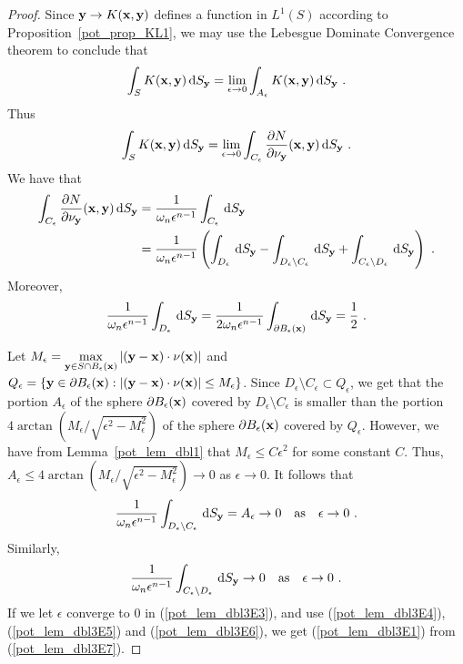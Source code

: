 \begin{proof}
Since $\mathbf{y} \to K(\mathbf{x},\mathbf{y})$ defines a function in
$\displaystyle L^1(S)$
according to Proposition~\ref{pot_prop_KL1}, we may use the Lebesgue
Dominate Convergence theorem to conclude that
\[
\int_S  K(\mathbf{x},\mathbf{y}) \,\mathrm{d}{S}_{\mathbf{y}}
= \lim_{\epsilon \to 0} \int_{A_\epsilon}  K(\mathbf{x},\mathbf{y}) \,\mathrm{d}{S}_{\mathbf{y}} \ .
\]
Thus
\begin{equation} \label{pot_lem_dbl3E7}
\int_S  K(\mathbf{x},\mathbf{y}) \,\mathrm{d}{S}_{\mathbf{y}}
= \lim_{\epsilon \to 0}
\int_{C_\epsilon} \frac{\partial{N}}{\partial \mathbf{\nu}_{\mathbf{y}}}(\mathbf{x},\mathbf{y}) \,\mathrm{d}{S}_{\mathbf{y}} \ .
\end{equation}
We have that
\begin{align}
\int_{C_\epsilon} \frac{\partial{N}}{\partial \mathbf{\nu}_{\mathbf{y}}}(\mathbf{x},\mathbf{y}) \,\mathrm{d}{S}_{\mathbf{y}}
&= \frac{1}{\omega_n \epsilon^{n-1}} \int_{C_\epsilon} \,\mathrm{d}{S}_{\mathbf{y}} \nonumber \\
&= \frac{1}{\omega_n \epsilon^{n-1}} \left( \int_{D_\epsilon} \,\mathrm{d}{S}_{\mathbf{y}}
- \int_{D_\epsilon \setminus C_\epsilon} \,\mathrm{d}{S}_{\mathbf{y}}
+ \int_{C_\epsilon \setminus D_\epsilon} \,\mathrm{d}{S}_{\mathbf{y}} \right) \ .
\label{pot_lem_dbl3E3} 
\end{align}
Moreover,
\begin{equation} \label{pot_lem_dbl3E4}
\frac{1}{\omega_n \epsilon^{n-1}} \int_{D_\epsilon} \dss{S}{y}
= \frac{1}{2 \omega_n \epsilon^{n-1}}
\int_{\partial B_\epsilon(\VEC{x})} \dss{S}{y} = \frac{1}{2} \ .
\end{equation}

Let
$\displaystyle
M_\epsilon = \max_{\mathbf{y}\in S \cap B_\epsilon(\mathbf{x})} \left|
  \left( \mathbf{y} - \mathbf{x}\right) \cdot \mathbf{\nu}(\mathbf{x}) \right|$
and
$Q_\epsilon = \left\{ \mathbf{y} \in \partial B_\epsilon(\mathbf{x}) :
\left| (\mathbf{y} - \mathbf{x}) \cdot \mathbf{\nu}(\mathbf{x}) \right| \leq
M_\epsilon \right\}$.
Since $D_\epsilon \setminus C_\epsilon \subset Q_\epsilon$, we get
that the portion $A_\epsilon$ of the sphere
$\partial B_\epsilon(\mathbf{x})$ covered by $D_\epsilon \setminus C_\epsilon$ 
is smaller than the portion
$\displaystyle 4 \arctan(M_\epsilon/\sqrt{\epsilon^2 - M_\epsilon^2})$
of the sphere $\partial B_\epsilon(\mathbf{x})$ covered by $Q_\epsilon$. 
However, we have from Lemma~\ref{pot_lem_dbl1} that
$M_\epsilon \leq C \epsilon^2$ for some constant $C$.  Thus,
$A_\epsilon \leq 4 \arctan(M_\epsilon/\sqrt{\epsilon^2 - M_\epsilon^2}) \to 0$ 
as $\epsilon \to 0$.  It follows that
\begin{equation} \label{pot_lem_dbl3E5}
\frac{1}{\omega_n \epsilon^{n-1}} \int_{D_\epsilon \setminus C_\epsilon} \,\mathrm{d}{S}_{\mathbf{y}}
= A_\epsilon \to 0 \quad \text{as} \quad \epsilon \to 0 \ .
\end{equation}
Similarly,
\begin{equation} \label{pot_lem_dbl3E6}
\frac{1}{\omega_n \epsilon^{n-1}} \int_{C_\epsilon \setminus D_\epsilon} \,\mathrm{d}{S}_{\mathbf{y}}
\to 0 \quad \text{as} \quad \epsilon \to 0 \ .
\end{equation}
If we let $\epsilon$ converge to $0$ in (\ref{pot_lem_dbl3E3}), and
use (\ref{pot_lem_dbl3E4}), (\ref{pot_lem_dbl3E5}) and
(\ref{pot_lem_dbl3E6}), we get (\ref{pot_lem_dbl3E1}) from
(\ref{pot_lem_dbl3E7}).
\end{proof}

